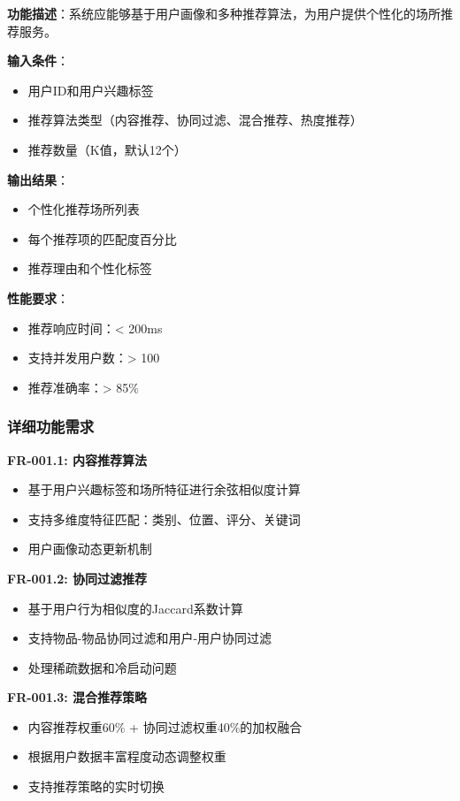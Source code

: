 \documentclass[12pt,a4paper]{article}
\begin{document}
\begin{reqbox}[title={FR-001: 个性化场所推荐}]
\textbf{功能描述}：系统应能够基于用户画像和多种推荐算法，为用户提供个性化的场所推荐服务。

\textbf{输入条件}：
\begin{itemize}[nosep]
    \item 用户ID和用户兴趣标签
    \item 推荐算法类型（内容推荐、协同过滤、混合推荐、热度推荐）
    \item 推荐数量（K值，默认12个）
\end{itemize}

\textbf{输出结果}：
\begin{itemize}[nosep]
    \item 个性化推荐场所列表
    \item 每个推荐项的匹配度百分比
    \item 推荐理由和个性化标签
\end{itemize}

\textbf{性能要求}：
\begin{itemize}[nosep]
    \item 推荐响应时间：< 200ms
    \item 支持并发用户数：> 100
    \item 推荐准确率：> 85\%
\end{itemize}
\end{reqbox}

\subsubsection{详细功能需求}

\textbf{FR-001.1: 内容推荐算法}
\begin{itemize}
    \item 基于用户兴趣标签和场所特征进行余弦相似度计算
    \item 支持多维度特征匹配：类别、位置、评分、关键词
    \item 用户画像动态更新机制
\end{itemize}

\textbf{FR-001.2: 协同过滤推荐}
\begin{itemize}
    \item 基于用户行为相似度的Jaccard系数计算
    \item 支持物品-物品协同过滤和用户-用户协同过滤
    \item 处理稀疏数据和冷启动问题
\end{itemize}

\textbf{FR-001.3: 混合推荐策略}
\begin{itemize}
    \item 内容推荐权重60\% + 协同过滤权重40\%的加权融合
    \item 根据用户数据丰富程度动态调整权重
    \item 支持推荐策略的实时切换
\end{itemize}
\end{document}
